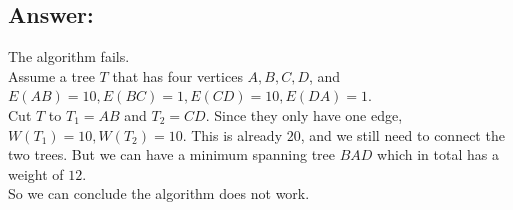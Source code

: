 \documentclass[letter]{article}
\begin{document}
\subsection*{Answer:}
The algorithm fails.\\
Assume a tree $T$ that has four vertices $A,B,C,D$, and $E(AB)=10, E(BC)=1, E(CD)=10, E(DA)=1$.\\
Cut $T$ to $T_1 = AB$ and $T_2=CD$. Since they only have one edge, $W(T_1)=10,W(T_2)=10$. This is already $20$, and we still need to connect the two trees. But we can have a minimum spanning tree $BAD$ which in total has a weight of $12$.\\
So we can conclude the algorithm does not work.
\end{document}
